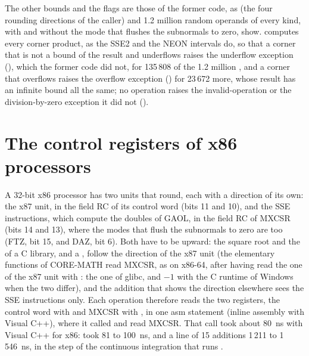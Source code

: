 \medskip
The other bounds and the flags are those of the former code, as
 (the four rounding directions of the caller) and 1.2
million random operands of every kind, with and without the mode that flushes
the subnormals to zero, show.  computes every corner product, as
the SSE2 and the NEON intervals do, so that a corner that is not a bound of
the result and underflows raises the underflow exception
(), which the former code did not, for 135\,808 of the
1.2 million , and a corner that overflows raises the overflow
exception () for 23\,672 more, whose result has an
infinite bound all the same; no operation raises the invalid-operation or the
division-by-zero exception it did not ().

\section{The control registers of x86 processors}
\label{sec:x86-control-registers}
%

A 32-bit x86 processor has two units that round, each with a direction of its
own: the x87 unit, in the field RC of its control word (bits 11 and 10), and
the SSE instructions, which compute the doubles of GAOL, in the field RC of
MXCSR (bits 14 and 13), where the modes that flush the subnormals to zero are
too (FTZ, bit 15, and DAZ, bit 6). Both have to be upward: the square root
and the  of a C library, and a , follow the
direction of the x87 unit (the elementary functions of CORE-MATH read MXCSR,
as on x86-64, after having read the one of the x87 unit with
: the one of glibc, and $-1$ with the C runtime of Windows
when the two differ), and the addition that shows the direction elsewhere
sees the SSE instructions only. Each operation therefore reads the two
registers, the control word with  and MXCSR with
, in one asm statement (inline assembly with Visual C++), where
it called  and read MXCSR.\newinvfive{} That call took
about 80~ns with Visual C++ for x86:  took 81 to 100~ns, and a
line of 15 additions 1\,211 to 1\,546~ns, in the step of the continuous
integration that runs .

